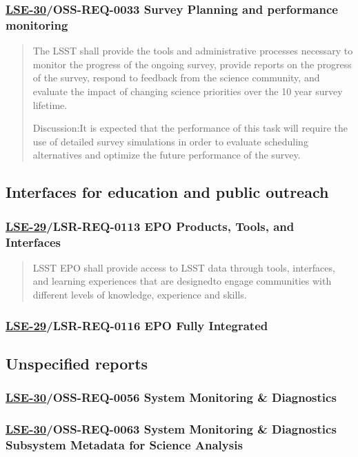 \subsubsection{\href{https://ls.st/lse-30}{LSE-30}/OSS-REQ-0033 Survey Planning and performance monitoring}
\label{sec:org14fb89e}
\begin{quote}
The LSST shall provide the tools and administrative processes
necessary to monitor the progress of the ongoing survey, provide
reports on the progress of the survey, respond to feedback from the
science community, and evaluate the impact of changing science
priorities over the 10 year survey lifetime.

Discussion:It is expected that the performance of this task will
require the use of detailed survey simulations in order to evaluate
scheduling alternatives and optimize the future performance of the
survey.
\end{quote}
\subsection{Interfaces for education and public outreach}
\label{sec:org20f84c4}
\subsubsection{\href{https://ls.st/lse-29}{LSE-29}/LSR-REQ-0113 EPO Products, Tools, and Interfaces}
\label{sec:orgddcc99f}
\begin{quote}
LSST EPO shall provide access to LSST data through tools, interfaces,
and learning experiences that are designedto engage communities with
different levels of knowledge, experience and skills.
\end{quote}
\subsubsection{\href{https://ls.st/lse-29}{LSE-29}/LSR-REQ-0116 EPO Fully Integrated}
\label{sec:orgf4096dd}
\subsection{Unspecified reports}
\label{sec:orgc808489}
\subsubsection{\href{https://ls.st/lse-30}{LSE-30}/OSS-REQ-0056 System Monitoring \& Diagnostics}
\label{sec:org4c7da18}
\subsubsection{\href{https://ls.st/lse-30}{LSE-30}/OSS-REQ-0063 System Monitoring \& Diagnostics Subsystem Metadata for Science Analysis}
\label{sec:org388f81a}
